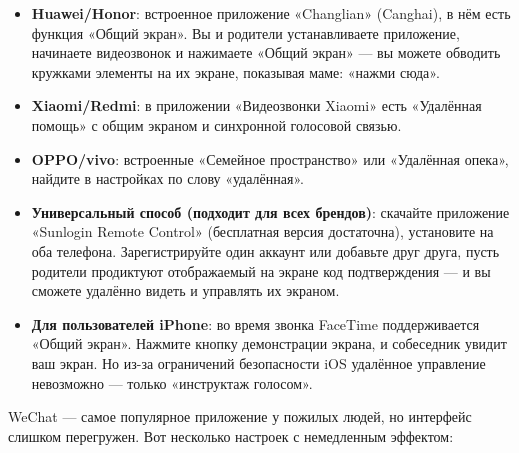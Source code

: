 \begin{itemize}
  \item \textbf{Huawei/Honor}: встроенное приложение «Changlian» (Canghai), в нём есть функция «Общий экран». Вы и родители устанавливаете приложение, начинаете видеозвонок и нажимаете «Общий экран» — вы можете обводить кружками элементы на их экране, показывая маме: «нажми сюда».
  \item \textbf{Xiaomi/Redmi}: в приложении «Видеозвонки Xiaomi» есть «Удалённая помощь» с общим экраном и синхронной голосовой связью.
  \item \textbf{OPPO/vivo}: встроенные «Семейное пространство» или «Удалённая опека», найдите в настройках по слову «удалённая».
  \item \textbf{Универсальный способ (подходит для всех брендов)}: скачайте приложение «Sunlogin Remote Control» (бесплатная версия достаточна), установите на оба телефона. Зарегистрируйте один аккаунт или добавьте друг друга, пусть родители продиктуют отображаемый на экране код подтверждения — и вы сможете удалённо видеть и управлять их экраном.
  \item \textbf{Для пользователей iPhone}: во время звонка FaceTime поддерживается «Общий экран». Нажмите кнопку демонстрации экрана, и собеседник увидит ваш экран. Но из-за ограничений безопасности iOS удалённое управление невозможно — только «инструктаж голосом».
\end{itemize}


WeChat — самое популярное приложение у пожилых людей, но интерфейс слишком перегружен. Вот несколько настроек с немедленным эффектом:

